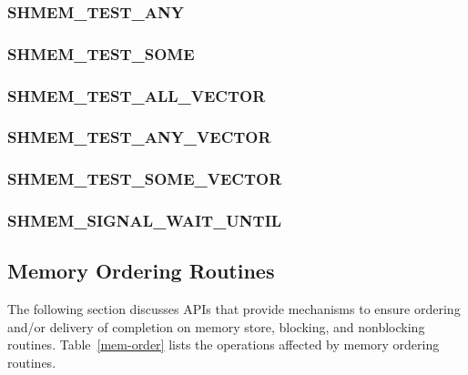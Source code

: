 \documentclass[10pt,oneside]{book}
\begin{document}
\subsubsection{\textbf{SHMEM\_TEST\_ANY}}\label{subsec:shmem_test_any}


\subsubsection{\textbf{SHMEM\_TEST\_SOME}}\label{subsec:shmem_test_some}


\subsubsection{\textbf{SHMEM\_TEST\_ALL\_VECTOR}}\label{subsec:shmem_test_all_vector}


\subsubsection{\textbf{SHMEM\_TEST\_ANY\_VECTOR}}\label{subsec:shmem_test_any_vector}


\subsubsection{\textbf{SHMEM\_TEST\_SOME\_VECTOR}}\label{subsec:shmem_test_some_vector}


\subsubsection{\textbf{SHMEM\_SIGNAL\_WAIT\_UNTIL}}\label{subsec:shmem_signal_wait_until}




\subsection{Memory Ordering Routines}\label{subsec:memory_order}
The following section discusses \openshmem \acp{API} that provide mechanisms to
ensure ordering and/or delivery of completion on memory store, blocking, and
nonblocking \openshmem routines. Table~\ref{mem-order} lists the operations
affected by \openshmem memory ordering routines.
\end{document}
